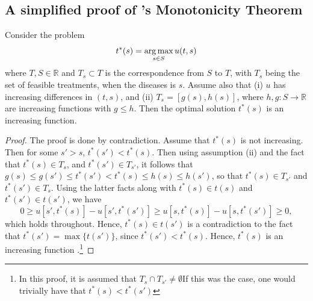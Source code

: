 \documentclass[10pt,a4paper]{article} 					%
\begin{document}
\begin{appendices}
\subsection[A simplified proof of Topkis’s Monotonicity Theorem is]{A simplified proof of 's Monotonicity Theorem}
\begin{thm}
	Consider the problem
	\[
		t^*(s)=\argmax_{s\in S} u(t,s)
	\]
	where $T,S\in \mathbb{R}$ and $T_s\subset T$ is the correspondence from $S$ to $T$, with $T_s$ being the set of feasible treatments, when the diseases is $s$. Assume also that (i) $u$ has increasing differences in $(t,s)$, and (ii) $T_s=[g(s),h(s)]$, where $h,g:S \rightarrow \mathbb{R}$ are increasing functions with $g\leq h$. Then the optimal solution $t^*(s)$ is an increasing function.
\end{thm}

\begin{proof}
	The proof is done by contradiction. Assume that $t^*(s)$ is not increasing. Then for some $s'>s$, $t^*(s')<t^*(s)$. Then using assumption (ii) and the fact that $t^*(s)\in T_s$, and $t^*(s')\in T_{s'}$, it follows that $g(s)\leq g(s')\leq t^*(s') < t^*(s) \leq h(s) \leq h(s')$, so that $t^*(s)\in T_{s'}$ and $t^*(s')\in T_s$. Using the latter facts along with $t^*(s)\in t(s)$ and $t^*(s')\in t(s')$, we have
	\[
		0\geq u[s',t^*(s)]-u[s',t^*(s')]\geq u[s,t^*(s)]-u[s,t^*(s')]\geq 0,
	\]
which holds throughout. Hence, $t^*(s)\in t(s')$ is a contradiction to the fact that $t^*(s')=\max \{t(s')\}$, since $t^*(s')<t^*(s)$. Hence, $t^*(s)$ is an increasing function \parencite{Amir2005a}.\footnote{In this proof, it is assumed that $T_s\cap T_{s'}\ne \emptyset$If this was the case, one would trivially have that $t^*(s)<t^*(s')$}

\end{proof}
\end{appendices}
\end{document}
